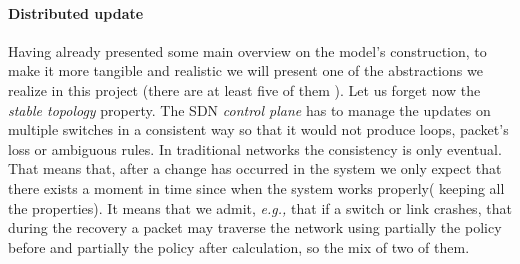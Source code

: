 \documentclass{article}
\theoremstyle{remark}
\begin{document}
\paragraph{Distributed update}
Having already presented some main overview on the model's construction, to make it more tangible and realistic we will present one of the abstractions we realize in this project (there are at least five of them \cite{Casado:2014:ASN:2661061.2661063}).
Let us forget now the \emph{stable topology} property.
The SDN \emph{control plane} has to manage the updates on multiple switches in a consistent way so that it would not produce loops, packet's loss or ambiguous rules. 
In traditional networks the consistency is only eventual. That means that, after a change has occurred in the system we only expect that there exists a moment in time since when the system works properly( keeping all the properties). It means that we admit, \emph{e.g.,} that if a switch or link crashes, that during the recovery a packet may traverse the network using partially the policy before and partially the policy after calculation, so the mix of two of them. 
\end{document}
